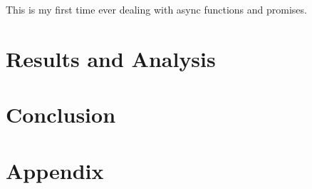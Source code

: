 \documentclass{report}
\begin{document}
This is my first time ever dealing with async functions and promises.

\chapter{Results and Analysis}
\newpage

\chapter{Conclusion}

\newpage



\newpage

\chapter{Appendix}
\end{document}
